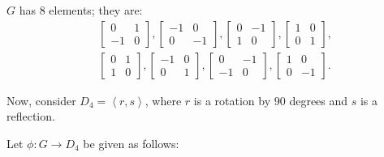\documentclass[a4paper,12pt]{article}
\begin{document}
$G$ has $8$ elements; they are:
\begin{align*}
&\left[\begin{smallmatrix}0&1\\ -1&0 \end{smallmatrix}\right],
\left[\begin{smallmatrix}-1&0\\ 0&-1 \end{smallmatrix}\right],
\left[\begin{smallmatrix}0&-1\\ 1&0 \end{smallmatrix}\right],
\left[\begin{smallmatrix}1&0\\ 0&1 \end{smallmatrix}\right],\\
&\left[\begin{smallmatrix}0&1\\ 1&0 \end{smallmatrix}\right],
\left[\begin{smallmatrix}-1&0\\ 0&1 \end{smallmatrix}\right],
\left[\begin{smallmatrix}0&-1\\ -1&0 \end{smallmatrix}\right],
\left[\begin{smallmatrix}1&0\\ 0&-1 \end{smallmatrix}\right].
\end{align*}

Now, consider $D_4 = \left\langle r, s \right\rangle$, where $r$ is a rotation by $90$ degrees and $s$ is a reflection.

Let $\phi : G \to D_4$ be given as follows:
\end{document}
